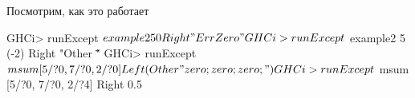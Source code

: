 \documentclass[11pt,a4paper]{article}
\begin{document}
Посмотрим, как это работает
\begin{hscode}
GHCi> runExcept $ example2 5 0
Right "ErrZero"
GHCi> runExcept $ example2 5 (-2)
Right "Other \"\""
GHCi> runExcept $ msum [5/?0, 7/?0, 2/?0]
Left (Other "zero;zero;zero;")
GHCi> runExcept $ msum [5/?0, 7/?0, 2/?4]
Right 0.5
\end{hscode}
\end{document}
